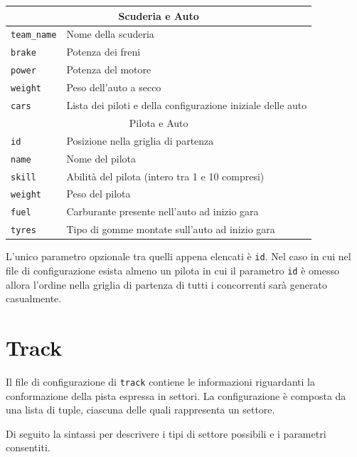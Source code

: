 \documentclass[a4paper]{report}
\begin{document}
\begin{center}
\begin{tabular}{|p{}|p{}|}
\hline
\multicolumn{2}{|c|}{Scuderia e Auto}\\
\hline
\texttt{team\_name} & Nome della scuderia\\
\texttt{brake} & Potenza dei freni\\
\texttt{power} & Potenza del motore\\
\texttt{weight} & Peso dell'auto a secco\\
\texttt{cars} & Lista dei piloti e della configurazione iniziale delle auto\\
\hline
\multicolumn{2}{|c|}{Pilota e Auto}\\
\hline
\texttt{id} & Posizione nella griglia di partenza\\
\texttt{name} & Nome del pilota\\
\texttt{skill} & Abilità del pilota (intero tra 1 e 10 compresi)\\
\texttt{weight} & Peso del pilota\\
\texttt{fuel} & Carburante presente nell'auto ad inizio gara\\
\texttt{tyres} & Tipo di gomme montate sull'auto ad inizio gara\\
\hline
\end{tabular}
\end{center}

L'unico parametro opzionale tra quelli appena elencati è \texttt{id}. Nel caso in cui nel file di configurazione esista almeno un pilota in cui il parametro \texttt{id} è omesso allora l'ordine nella griglia di partenza di tutti i concorrenti sarà generato casualmente.

\section*{Track}
Il file di configurazione di \texttt{track} contiene le informazioni riguardanti la conformazione della pista espressa in settori. La configurazione è composta da una lista di tuple, ciascuna delle quali rappresenta un settore.

Di seguito la sintassi per descrivere i tipi di settore possibili e i parametri consentiti.
\end{document}
